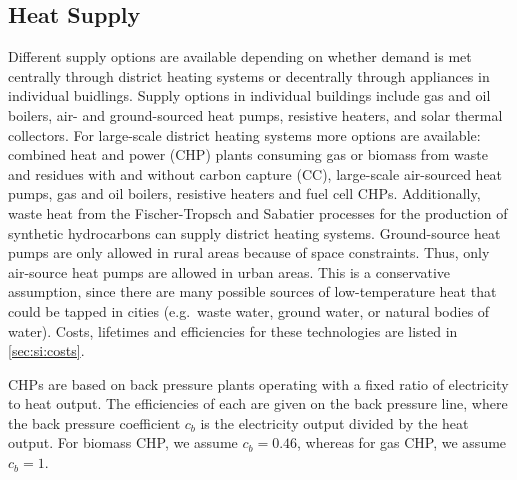 
\subsection{Heat Supply}
\label{sec:si:heat:supply}

Different supply options are available depending on whether demand is met
centrally through district heating systems or decentrally through appliances in
individual buidlings. Supply options in individual buildings include gas and oil
boilers, air- and ground-sourced heat pumps, resistive heaters, and solar
thermal collectors. For large-scale district heating systems more options are
available: combined heat and power (CHP) plants consuming gas or biomass from
waste and residues with and without carbon capture (CC), large-scale air-sourced
heat pumps, gas and oil boilers, resistive heaters and fuel cell CHPs.
Additionally, waste heat from the Fischer-Tropsch and Sabatier processes for the
production of synthetic hydrocarbons can supply district heating systems.
Ground-source heat pumps are only allowed in rural areas because of space constraints.
Thus, only air-source heat pumps are allowed in urban areas. This is a conservative
assumption, since there are many possible sources of low-temperature heat that
could be tapped in cities (e.g.~waste water, ground water, or natural bodies of water).
Costs, lifetimes and efficiencies for these technologies are listed in \cref{sec:si:costs}.


CHPs are based on back pressure plants operating with a fixed ratio of
electricity to heat output. The efficiencies of each are given on the back
pressure line, where the back pressure coefficient $c_b$ is the electricity
output divided by the heat output. For biomass CHP, we assume $c_b=0.46$,
whereas for gas CHP, we assume $c_b=1$.


